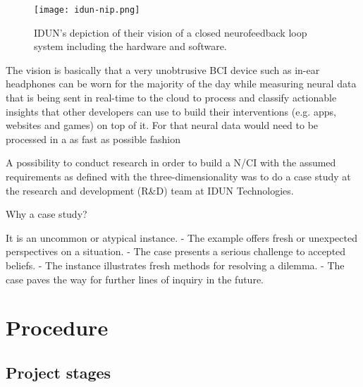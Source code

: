 \begin{figure}[!ht]
  \centering
  \texttt{[image: idun-nip.png]}
  \caption{IDUN's depiction of their vision of a closed neurofeedback loop system including the hardware and software.}
  \label{fig:idun-nip}
\end{figure}

The vision is basically that a very unobtrusive BCI device such as in-ear headphones can be worn for the majority of the day while measuring neural data that is being sent in real-time to the cloud to process and classify actionable insights that other developers can use to build their interventions (e.g. apps, websites and games) on top of it. For that neural data would need to be processed in a as fast as possible fashion

A possibility to conduct research in order to build a N/CI with the assumed requirements as defined with the three-dimensionality was to do a case study at the research and development (R\&D) team at IDUN Technologies.

Why a case study?

It is an uncommon or atypical instance.
- The example offers fresh or unexpected perspectives on a situation.
- The case presents a serious challenge to accepted beliefs.
- The instance illustrates fresh methods for resolving a dilemma.
- The case paves the way for further lines of inquiry in the future.


\section{Procedure}
\label{chapter3-procedure}

\subsection{Project stages}
\label{chapter3-project-stages}


